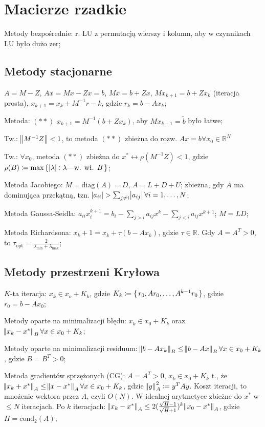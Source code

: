 \section{Macierze rzadkie}

\entry
Metody bezpośrednie: r. LU z permutacją wierszy i kolumn, aby w czynnikach LU było dużo zer;


\subsection{Metody stacjonarne}

\entry
$A=M-Z$, $Ax=Mx-Zx=b$, $Mx=b+Zx$, $Mx_{k+1}=b+Zx_{k}$ (iteracja prosta), $x_{k+1}=x_k+M^{-1}r-k$, gdzie $r_k=b-Ax_k$;

\entry
Metoda: $\mathrm{(**)}$ $x_{k+1}=M^{-1}(b+Zx_k)$,
aby $Mx_{k+1}=\tilde{b}$ było łatwe;

\entry
Tw.: $\norm{M^{-1}Z} < 1$,
to metoda $\mathrm{(**)}$ zbieżna do rozw. $Ax=b \forall x_0 \in \mathbb{R}^N$

\entry
Tw.: $\forall x_0$,
metoda $\mathrm{(**)}$
zbieżna do $x^* \leftrightarrow \rho(M^{-1}Z) < 1$,
gdzie $\rho(B) \coloneqq \max\set{\abs{\lambda} : \lambda\text{---w. wł. } B}$;

\entry
Metoda Jacobiego:
$M=\mathrm{diag}(A) = D$, $A=L+D+U$;
zbieżna, gdy $A$ ma dominująca przekątną,
tzn. $\abs{a_{ii}} > \sum_{j\neq i}\abs{a_{ij}} \forall i=1, \ldots, N$;

\entry
Metoda Gaussa-Seidla: $a_{ii}x_i^{k+1}=b_i-\sum_{j>i}a_{ij}x^k-\sum_{j<i}a_{ij}x^{k+1}$; $M = LD$;

\entry
Metoda Richardsona:
$x_k+1 = x_k + \tau(b-Ax_k)$, gdzie $\tau\in\mathbb{R}$.
Gdy $A=A^T>0$, to $\tau_{\mathrm{opt}}=\frac{2}{\lambda_{\mathrm{min}} + \lambda_{\mathrm{max}} }$;

\subsection{Metody przestrzeni Kryłowa}

\entry
$K$-ta iteracja: $x_k\in x_o+K_k$, gdzie $K_k\coloneqq \set{r_0, Ar_0,\ldots, A^{k-1}r_0}$, gdzie $r_0=b-Ax_0$;

\entry
Metody oparte na minimalizacji błędu: $x_k\in x_0 +K_k$ oraz $\norm{x_k - x^*}_B \forall x\in x_0 + K_k$;

\entry
Metody oparte na minimalizacji residuum: $\norm{b-Ax_k}_B \leq \norm{b-Ax}_B \forall x\in x_0 +K_k$, gdzie $B=B^T>0$;

\entry
Metoda gradientów sprzężonych (CG):
$A=A^T>0$, $x_k\in x_0 + K_k$ t., że $\norm{x_k+x^*}_A\leq \norm{x-x^*}_A \forall x\in x_0 + K_k$, gdzie $\norm{y}^2_A \coloneqq y^TAy$.
Koszt iteracji, to mnożenie wektora przez $A$, czyli $O(N)$.
W idealnej arytmetyce zbieżne do $x^*$ w $\leq N$ iteracjach.
Po $k$ iteracjach: $\norm{x_k - x^*}_A\leq 2(\frac{\sqrt{H} - 1}{\sqrt{H} + 1})^k\norm{x_0-x^*}_A$, gdzie $H=\mathrm{cond}_2(A)$;

